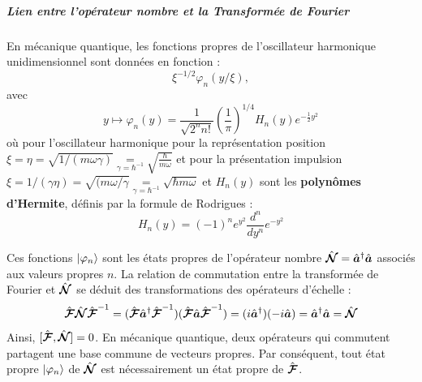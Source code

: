 \subparagraph{Lien entre l'opérateur nombre et la Transformée de Fourier}

En mécanique quantique, les fonctions propres de l'oscillateur harmonique unidimensionnel sont données en fonction :
\begin{equation}
    \xi^{-1/2}\varphi_n(y/\xi),
\end{equation}
avec
\begin{equation}
    y \mapsto \varphi_n(y) = \frac{1}{\sqrt{2^n n!}} \left( \frac{1}{\pi} \right)^{1/4} H_n\left( y \right) e^{-\frac{1}{2}y^2}
\end{equation}
où pour l'oscillateur harmonique pour la représentation position $\xi = \eta =  \sqrt{1/(m \omega \gamma)} \underset{\gamma = \hbar^{-1}}{=} \sqrt{\frac{\hbar}{m\omega}}$  et pour la présentation impulsion $\xi = 1/(\gamma \eta) =  \sqrt{ (m \omega/\gamma} \underset{\gamma = \hbar^{-1}}{=} \sqrt{\hbar m\omega }$ et $H_n(y)$ sont les \textbf{polynômes d'Hermite}, définis par la formule de Rodrigues :
\begin{equation}
    H_n(y) = (-1)^n e^{y^2} \frac{d^n}{dy^n} e^{-y^2}
\end{equation}

Ces fonctions $\ket{\varphi_n}$ sont les états propres de l'opérateur nombre $\hat{\bm{\mathcal N}} = \hat{\bm{a}}^\dagger \hat{\bm{a}}$ associés aux valeurs propres $n$. La relation de commutation entre la transformée de Fourier et $\hat{\bm{\mathcal N}}$ se déduit des transformations des opérateurs d'échelle :
\begin{equation}
    \hat{\bm{\mathcal{F}}} \hat{\bm{\mathcal N}} \hat{\bm{\mathcal{F}}}^{-1} = (\hat{\bm{\mathcal{F}}} \hat{\bm{a}}^\dagger \hat{\bm{\mathcal{F}}}^{-1})(\hat{\bm{\mathcal{F}}} \hat{\bm{a}} \hat{\bm{\mathcal{F}}}^{-1}) = (i \hat{\bm{a}}^\dagger)(-i \hat{\bm{a}}) = \hat{\bm{a}}^\dagger \hat{\bm{a}} = \hat{\bm{\mathcal N}}
\end{equation}
Ainsi, $[\hat{\bm{\mathcal{F}}}, \hat{\bm{\mathcal N}}] = 0$. En mécanique quantique, deux opérateurs qui commutent partagent une base commune de vecteurs propres. Par conséquent, tout état propre $\ket{\varphi_n}$ de $\hat{\bm{\mathcal N}}$ est nécessairement un état propre de $\hat{\bm{\mathcal{F}}}$.

